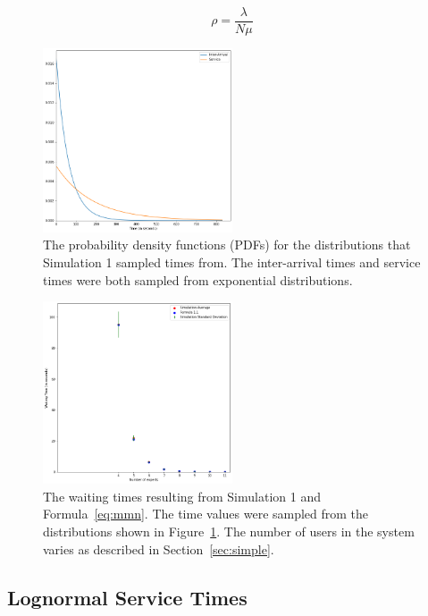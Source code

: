 \begin{equation}
\rho = \frac{\lambda}{N \mu}
\label{eq:occupancy}
\end{equation}

\begin{figure}[h]
  \includegraphics[width=0.5\textwidth]{figures/montecarlo/expon_expon.png}
  \caption{
    The probability density functions (PDFs) for the distributions that
    Simulation 1 sampled times from.
    The inter-arrival times and service times were both sampled from
    exponential distributions.
  }\label{fig:simple_sim1_dists}
\end{figure}

\begin{figure}[h]
  \includegraphics[width=0.5\textwidth]{figures/montecarlo/independent_calls_expon.png}
  \caption{
    The waiting times resulting from Simulation 1 and Formula~\ref{eq:mmn}.
    The time values were sampled from the distributions shown in
    Figure~\ref{fig:simple_sim1_dists}.
    The number of users in the system varies as described in
    Section~\ref{sec:simple}.
  }\label{fig:simple_sim1_results}
\end{figure}

\subsection{Lognormal Service Times}\label{sec:sim_lognormal}

